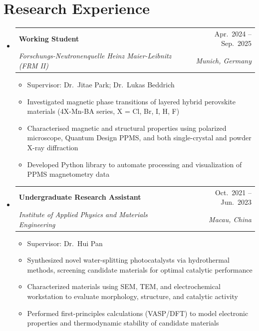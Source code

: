 \documentclass[letterpaper,11pt]{article}
\makeatletter
\newcommand{\resumeItem}[1]{
  \item\small{
    {#1 \vspace{-2pt}}
  }
}
\newcommand{\resumeSubheading}[4]{
  \vspace{-2pt}\item
    \begin{tabular*}{0.97\textwidth}[t]{l@{\extracolsep{\fill}}r}
      \textbf{#1} & #2 \\
      \textit{\small#3} & \textit{\small #4} \\
    \end{tabular*}\vspace{-7pt}
}
\newcommand{\resumeSubHeadingListStart}{\begin{itemize}[leftmargin=0.15in, label={}]}
\newcommand{\resumeSubHeadingListEnd}{\end{itemize}}
\newcommand{\resumeItemListStart}{\begin{itemize}}
\newcommand{\resumeItemListEnd}{\end{itemize}\vspace{-5pt}}
\makeatother
\begin{document}
\section{Research Experience}
  \resumeSubHeadingListStart
    \resumeSubheading
      {Working Student}{Apr.\ 2024 -- Sep.\ 2025}
      {Forschungs-Neutronenquelle Heinz Maier-Leibnitz (FRM II)}{Munich, Germany}
      \resumeItemListStart
        \resumeItem{Supervisor: Dr.\ Jitae Park; Dr.\ Lukas Beddrich}
        \resumeItem{Investigated magnetic phase transitions of layered hybrid perovskite materials (4X-Mn-BA series, X = Cl, Br, I, H, F)}
        \resumeItem{Characterised magnetic and structural properties using polarized microscope, Quantum Design PPMS, and both single-crystal and powder X-ray diffraction}
        \resumeItem{Developed Python library to automate processing and visualization of PPMS magnetometry data}
      \resumeItemListEnd
    \resumeSubheading
      {Undergraduate Research Assistant}{Oct.\ 2021 -- Jun.\ 2023}
      {Institute of Applied Physics and Materials Engineering}{Macau, China}
      \resumeItemListStart
        \resumeItem{Supervisor: Dr.\ Hui Pan}
        \resumeItem{Synthesized novel water-splitting photocatalysts via hydrothermal methods, screening candidate materials for optimal catalytic performance}
        \resumeItem{Characterized materials using SEM, TEM, and electrochemical workstation to evaluate morphology, structure, and catalytic activity}
        \resumeItem{Performed first-principles calculations (VASP/DFT) to model electronic properties and thermodynamic stability of candidate materials}
      \resumeItemListEnd
  \resumeSubHeadingListEnd


\end{document}
